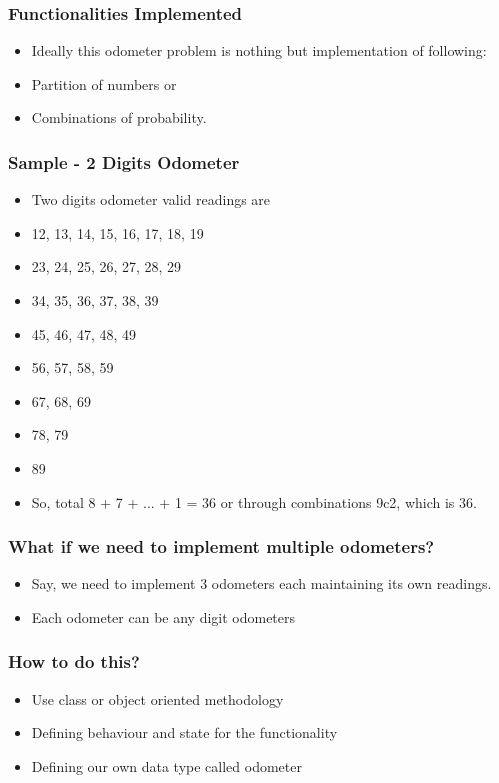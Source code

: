 \documentclass[14pt]{beamer}
\begin{document}
    \begin{frame}[containsverbatim]
        \frametitle{Functionalities Implemented}
        \begin{itemize}
        \item Ideally this odometer problem is nothing but implementation of following:
        \item Partition of numbers or 
        \item Combinations of probability.
        \end{itemize}
    \end{frame}

    \begin{frame}[containsverbatim]
        \frametitle{Sample - 2 Digits Odometer}
        \begin{itemize}
        \item Two digits odometer valid readings are 
        \item[] 12, 13, 14, 15, 16, 17, 18, 19
        \item[]     23, 24, 25, 26, 27, 28, 29
        \item[]         34, 35, 36, 37, 38, 39
        \item[]             45, 46, 47, 48, 49
        \item[]                 56, 57, 58, 59
        \item[]                     67, 68, 69
        \item[]                         78, 79
        \item[]                             89
        \item So, total 8 + 7 + ... + 1 = 36 or through combinations 9c2, which is 36.
        \end{itemize}
    \end{frame}

    \begin{frame}[containsverbatim]
        \frametitle{What if we need to implement multiple odometers?}
        \begin{itemize}
        \item Say, we need to implement 3 odometers each maintaining its own readings. 
        \item Each odometer can be any digit odometers
        \end{itemize}
    \end{frame}

    \begin{frame}[containsverbatim]
        \frametitle{How to do this?}
        \begin{itemize}
        \item Use class or object oriented methodology
        \item Defining behaviour and state for the functionality
        \item Defining our own data type called odometer
        \end{itemize}
    \end{frame}
\end{document}
